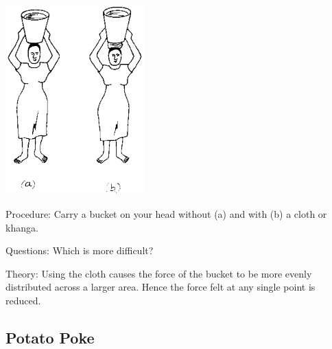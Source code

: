 \begin{multicols}{2}
\begin{center}
\includegraphics[width=0.4\textwidth]{./img/source/load-head.png}
\end{center}

\begin{description*}
\item[Procedure:]{Carry a bucket on your head without (a) and with (b) a cloth or khanga.}
\item[Questions:]{Which is more difficult?}
\item[Theory:]{Using the cloth causes the force of the bucket to be more evenly distributed across a larger area. Hence the force felt at any single point is reduced.}
\end{description*}

\subsection{Potato Poke}



\end{multicols}
